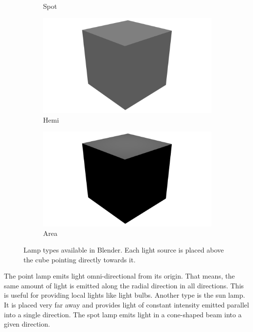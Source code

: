 \begin{figure}
\begin{subfigure}{0.19\textwidth}
		\caption{Spot}
	\end{subfigure}
	\begin{subfigure}{0.19\textwidth}
		\centering
		\includegraphics[width=\textwidth]{images/hemi.png}
		\caption{Hemi}
	\end{subfigure}
	\begin{subfigure}{0.19\textwidth}
		\centering
		\includegraphics[width=\textwidth]{images/area.png}
		\caption{Area}
	\end{subfigure}
	\caption[Lamp Types Available in Blender]{Lamp types available in Blender. Each light source is placed above the cube pointing directly towards it.}
	\label{fig:blender-lamps}
\end{figure}
The point lamp emits light omni-directional from its origin.
That means, the same amount of light is emitted along the radial direction in all directions.
This is useful for providing local lights like light bulbs.
Another type is the sun lamp.
It is placed very far away and provides light of constant intensity emitted parallel into a single direction.
The spot lamp emits light in a cone-shaped beam into a given direction.
